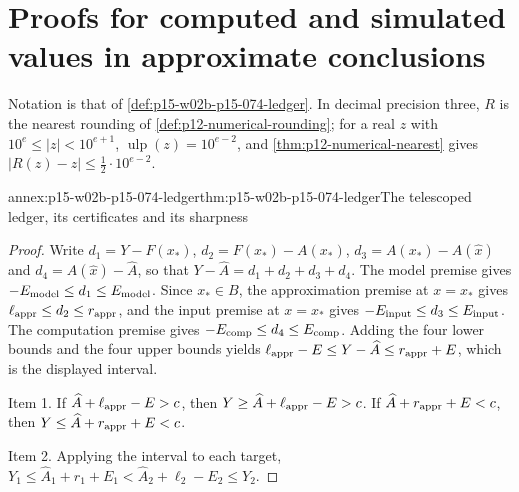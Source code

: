 \section{Proofs for computed and simulated values in approximate conclusions}
\label{sec:annex-p15-w02b-p15-074}

Notation is that of \cref{def:p15-w02b-p15-074-ledger}. In decimal
precision three, \(R\) is the nearest rounding of
\cref{def:p12-numerical-rounding}; for a real \(z\) with
\(10^e\leq|z|<10^{e+1}\), \(\operatorname{ulp}(z)=10^{e-2}\), and
\cref{thm:p12-numerical-nearest} gives \(|R(z)-z|\leq\tfrac12\cdot10^{e-2}\).

\begin{annexitem}{annex:p15-w02b-p15-074-ledger}{thm:p15-w02b-p15-074-ledger}{The telescoped ledger, its certificates and its sharpness}
\begin{proof}
Write \(d_1=Y-F(x_*)\), \(d_2=F(x_*)-A(x_*)\),
\(d_3=A(x_*)-A(\widehat x)\) and \(d_4=A(\widehat x)-\widehat A\), so
that \(Y-\widehat A=d_1+d_2+d_3+d_4\). The model premise gives
\(-E_{\rm model}\leq d_1\leq E_{\rm model}\). Since \(x_*\in B\), the
approximation premise at \(x=x_*\) gives
\(\ell_{\rm appr}\leq d_2\leq r_{\rm appr}\), and the input premise at
\(x=x_*\) gives \(-E_{\rm input}\leq d_3\leq E_{\rm input}\). The
computation premise gives \(-E_{\rm comp}\leq d_4\leq E_{\rm comp}\).
Adding the four lower bounds and the four upper bounds yields
\(\ell_{\rm appr}-E\leq Y-\widehat A\leq r_{\rm appr}+E\), which is the
displayed interval.

Item 1. If \(\widehat A+\ell_{\rm appr}-E>c\), then
\(Y\geq\widehat A+\ell_{\rm appr}-E>c\). If
\(\widehat A+r_{\rm appr}+E<c\), then
\(Y\leq\widehat A+r_{\rm appr}+E<c\).

Item 2. Applying the interval to each target,
\(Y_1\leq\widehat A_1+r_1+E_1<\widehat A_2+\ell_2-E_2\leq Y_2\).


\end{proof}
\end{annexitem}
